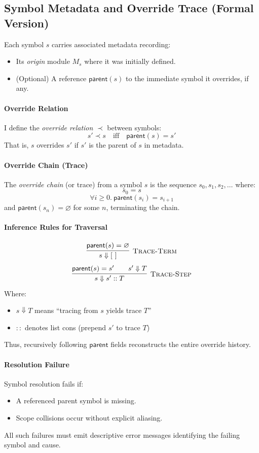 \documentclass[sigplan,screen]{acmart}
\begin{document}
\subsection{Symbol Metadata and Override Trace (Formal Version)}

Each symbol $s$ carries associated metadata recording:
\begin{itemize}
    \item Its \emph{origin} module $M_s$ where it was initially defined.
    \item (Optional) A reference $\mathsf{parent}(s)$ to the immediate symbol it overrides, if any.
\end{itemize}

\paragraph{Override Relation}
I define the \emph{override relation} $\prec$ between symbols:
\[
s' \prec s \quad \text{iff} \quad \mathsf{parent}(s) = s'
\]
That is, $s$ overrides $s'$ if $s'$ is the parent of $s$ in metadata.

\paragraph{Override Chain (Trace)}
The \emph{override chain} (or trace) from a symbol $s$ is the sequence $s_0, s_1, s_2, \dots$ where:
\[
s_0 = s
\]
\[
\forall i \geq 0.\ \mathsf{parent}(s_i) = s_{i+1}
\]
and $\mathsf{parent}(s_n) = \varnothing$ for some $n$, terminating the chain.

\paragraph{Inference Rules for Traversal}
\[
\infer[\textsc{Trace-Term}] {s \Downarrow [\ ]} {
    \mathsf{parent}(s) = \varnothing
}
\]
\[
\infer[\textsc{Trace-Step}] {s \Downarrow s' :: T} {
    \mathsf{parent}(s) = s' \quad\quad s' \Downarrow T
}
\]
Where:
\begin{itemize}
    \item $s \Downarrow T$ means ``tracing from $s$ yields trace $T$''
    \item $::$ denotes list cons (prepend $s'$ to trace $T$)
\end{itemize}

Thus, recursively following $\mathsf{parent}$ fields reconstructs the entire override history.

\paragraph{Resolution Failure}
Symbol resolution fails if:
\begin{itemize}
    \item A referenced parent symbol is missing.
    \item Scope collisions occur without explicit aliasing.
\end{itemize}
All such failures must emit descriptive error messages identifying the failing symbol and cause.
\end{document}
